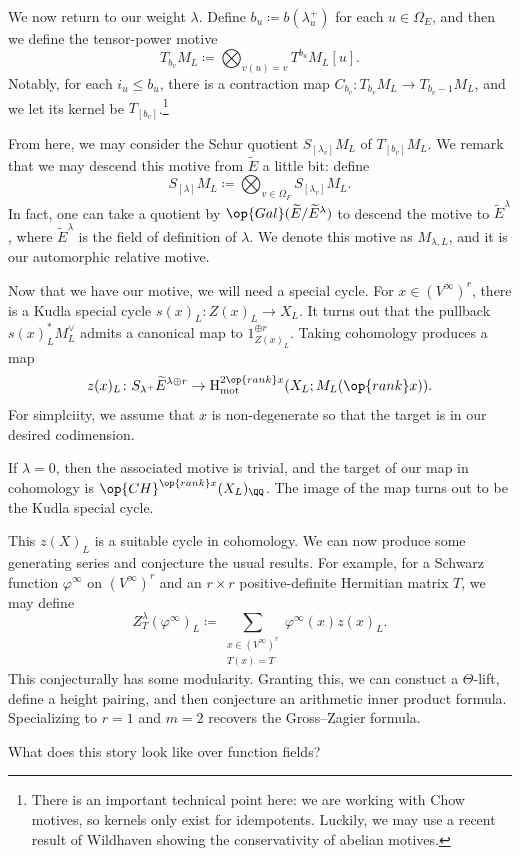 \documentclass{article}
\begin{document}
We now return to our weight $\lambda$. Define $b_u\coloneqq b(\lambda_u^+)$ for each $u\in\Omega_E$, and then we define the tensor-power motive
\[T_{b_v}M_L\coloneqq\bigotimes_{v(u)=v}T^{b_u}M_L[u].\]
Notably, for each $i_u\le b_u$, there is a contraction map $C_{b_v}\colon T_{b_v}M_L\to T_{b_v-1}M_L$, and we let its kernel be $T_{[b_v]}$.\footnote{There is an important technical point here: we are working with Chow motives, so kernels only exist for idempotents. Luckily, we may use a recent result of Wildhaven showing the conservativity of abelian motives.}

From here, we may consider the Schur quotient $S_{[\lambda_v]}M_L$ of $T_{[b_v]}M_L$. We remark that we may descend this motive from $\widetilde E$ a little bit: define
\[S_{[\lambda]}M_L\coloneqq\bigotimes_{v\in\Omega_F}S_{[\lambda_v]}M_L.\]
In fact, one can take a quotient by $\op{Gal}(\widetilde E/\widetilde E^\lambda)$ to descend the motive to $\widetilde E^\lambda$, where $\widetilde E^\lambda$ is the field of definition of $\lambda$. We denote this motive as $M_{\lambda,L}$, and it is our automorphic relative motive.

Now that we have our motive, we will need a special cycle. For $x\in (V^\infty)^r$, there is a Kudla special cycle $s(x)_L\colon Z(x)_L\to X_L$. It turns out that the pullback $s(x)_L^*M_L^\lor$ admits a canonical map to $1_{Z(x)_L}^{\oplus r}$. Taking cohomology produces a map
\[z(x)_L\colon S_{\lambda^+}\widetilde E^{\lambda\oplus r}\to\mathrm H^{2\op{rank}x}_{\mathrm{mot}}(X_L;M_L(\op{rank}x)).\]
For simplciity, we assume that $x$ is non-degenerate so that the target is in our desired codimension.
\begin{example}
	If $\lambda=0$, then the associated motive is trivial, and the target of our map in cohomology is $\op{CH}^{\op{rank}x}(X_L)_\QQ$. The image of the map turns out to be the Kudla special cycle.
\end{example}
This $z(X)_L$ is a suitable cycle in cohomology. We can now produce some generating series and conjecture the usual results. For example, for a Schwarz function $\varphi^\infty$ on $(V^\infty)^r$ and an $r\times r$ positive-definite Hermitian matrix $T$, we may define
\[Z_T^\lambda(\varphi^\infty)_L\coloneqq\sum_{\substack{x\in(V^\infty)^r\\T(x)=T}}\varphi^\infty(x)z(x)_L.\]
This conjecturally has some modularity. Granting this, we can constuct a $\Theta$-lift, define a height pairing, and then conjecture an arithmetic inner product formula. Specializing to $r=1$ and $m=2$ recovers the Gross--Zagier formula.
\begin{idea}
	What does this story look like over function fields?
\end{idea}
\end{document}
